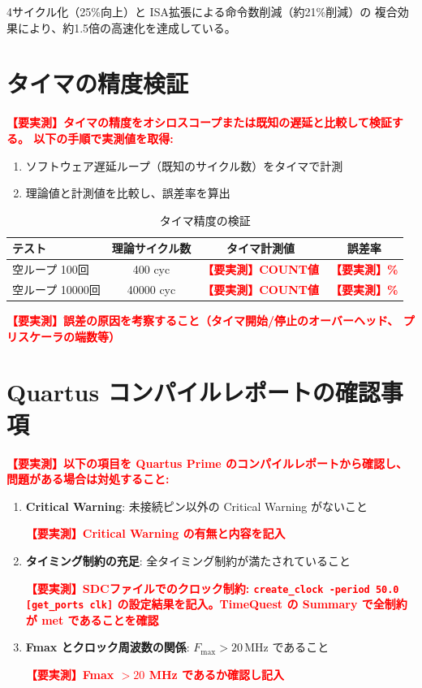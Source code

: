 \documentclass[a4paper,11pt]{ltjsarticle}
\newcommand{\measured}[1]{\textcolor{red}{\textbf{【要実測】#1}}}
\begin{document}
4サイクル化（25\%向上）と ISA拡張による命令数削減（約21\%削減）の
複合効果により、約1.5倍の高速化を達成している。


\section{タイマの精度検証}

\measured{タイマの精度をオシロスコープまたは既知の遅延と比較して検証する。
以下の手順で実測値を取得:}

\begin{enumerate}
\item ソフトウェア遅延ループ（既知のサイクル数）をタイマで計測
\item 理論値と計測値を比較し、誤差率を算出
\end{enumerate}

\begin{table}[h]
\centering
\caption{タイマ精度の検証}
\begin{tabular}{lccc}
\toprule
テスト & 理論サイクル数 & タイマ計測値 & 誤差率 \\
\midrule
空ループ 100回 & 400 cyc & \measured{COUNT値} & \measured{\%} \\
空ループ 10000回 & 40000 cyc & \measured{COUNT値} & \measured{\%} \\
\bottomrule
\end{tabular}
\end{table}

\measured{誤差の原因を考察すること（タイマ開始/停止のオーバーヘッド、
プリスケーラの端数等）}


\section{Quartus コンパイルレポートの確認事項}

\measured{以下の項目を Quartus Prime のコンパイルレポートから確認し、
問題がある場合は対処すること:}

\begin{enumerate}
\item \textbf{Critical Warning}: 未接続ピン以外の Critical Warning がないこと

  \measured{Critical Warning の有無と内容を記入}

\item \textbf{タイミング制約の充足}: 全タイミング制約が満たされていること

  \measured{SDCファイルでのクロック制約: \texttt{create\_clock -period 50.0 [get\_ports clk]}
  の設定結果を記入。TimeQuest の Summary で全制約が met であることを確認}

\item \textbf{Fmax とクロック周波数の関係}: $F_{\max} > 20\,\mathrm{MHz}$ であること

  \measured{Fmax $> 20$ MHz であるか確認し記入}
\end{enumerate}
\end{document}
